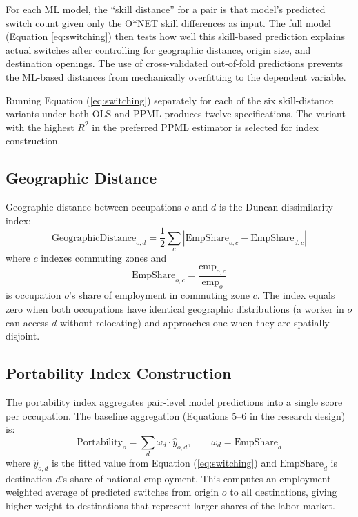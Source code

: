\documentclass[12pt]{article}
\begin{document}
For each ML model, the ``skill distance'' for a pair is that model's predicted switch count given only the O*NET skill differences as input. The full model (Equation \ref{eq:switching}) then tests how well this skill-based prediction explains actual switches after controlling for geographic distance, origin size, and destination openings. The use of cross-validated out-of-fold predictions prevents the ML-based distances from mechanically overfitting to the dependent variable.

Running Equation (\ref{eq:switching}) separately for each of the six skill-distance variants under both OLS and PPML produces twelve specifications. The variant with the highest $R^2$ in the preferred PPML estimator is selected for index construction.

\subsection{Geographic Distance}
\label{sec:strategy_geo}

Geographic distance between occupations $o$ and $d$ is the Duncan dissimilarity index:
\begin{equation}
\label{eq:duncan}
\text{GeographicDistance}_{o,d} = \frac{1}{2} \sum_{c} \left| \text{EmpShare}_{o,c} - \text{EmpShare}_{d,c} \right|
\end{equation}
where $c$ indexes commuting zones and
\begin{equation}
\label{eq:empshare}
\text{EmpShare}_{o,c} = \frac{\text{emp}_{o,c}}{\text{emp}_o}
\end{equation}
is occupation $o$'s share of employment in commuting zone $c$. The index equals zero when both occupations have identical geographic distributions (a worker in $o$ can access $d$ without relocating) and approaches one when they are spatially disjoint.

\subsection{Portability Index Construction}
\label{sec:strategy_index}

The portability index aggregates pair-level model predictions into a single score per occupation. The baseline aggregation (Equations 5--6 in the research design) is:
\begin{equation}
\label{eq:portability}
\text{Portability}_o = \sum_{d} \omega_d \cdot \hat{y}_{o,d}, \qquad \omega_d = \text{EmpShare}_d
\end{equation}
where $\hat{y}_{o,d}$ is the fitted value from Equation (\ref{eq:switching}) and $\text{EmpShare}_d$ is destination $d$'s share of national employment. This computes an employment-weighted average of predicted switches from origin $o$ to all destinations, giving higher weight to destinations that represent larger shares of the labor market.
\end{document}
